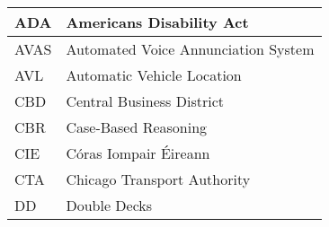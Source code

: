 



\begin{longtable}{p{90pt}l}
\hline ADA      & Americans Disability Act \\
\hline AVAS     & Automated Voice Annunciation System \\
\hline AVL      & Automatic Vehicle Location \\
\hline CBD      & Central Business District \\
\hline CBR      & Case-Based Reasoning \\
\hline CIE      & C\'{o}ras Iompair \'{E}ireann \\
\hline CTA      & Chicago Transport Authority \\
\hline DD       & Double Decks \\



\hline
\end{longtable}






